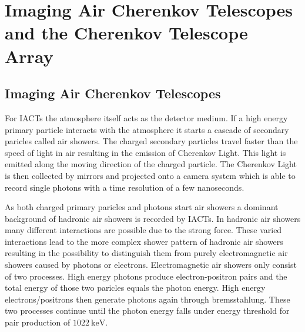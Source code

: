 \chapter{Imaging Air Cherenkov Telescopes and the Cherenkov Telescope Array}
\label{ch:cta}

\section{Imaging Air Cherenkov Telescopes}
For IACTs the atmosphere itself acts as the detector medium. 
If a high energy primary particle interacts with the atmosphere it starts a cascade of secondary paricles called air showers.
The charged secondary particles travel faster than the speed of light in air resulting in the emission of Cherenkov Light.
This light is emitted along the moving direction of the charged particle.
The Cherenkov Light is then collected by mirrors and projected onto a camera system which is able to record single photons with a time resolution of a few nanoseconds.

As both charged primary paricles and photons start air showers a dominant background of hadronic air showers is recorded by IACTs.
In hadronic air showers many different interactions are possible due to the strong force.
These varied interactions lead to the more complex shower pattern of hadronic air showers resulting in the possibility to distinguish them from purely electromagnetic
air showers caused by photons or electrons.
Electromagnetic air showers only consist of two processes. 
High energy photons produce electron-positron pairs and the total energy of those two paricles equals the photon energy. 
High energy electrons/positrons then generate photons again through bremsstahlung. 
These two processes continue until the photon energy falls under energy threshold for pair production of $\SI{1022}{\kilo\electronvolt}$.


